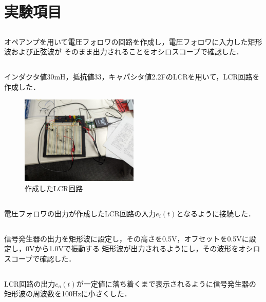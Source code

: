 \documentclass{jlreq}
\begin{document}
    
\tableofcontents
\clearpage

\section{実験項目}
\subsection{}
オペアンプを用いて電圧フォロワの回路を作成し，電圧フォロワに入力した矩形波および正弦波が
そのまま出力されることをオシロスコープで確認した．

\subsection{}
インダクタ値30mH，抵抗値33\Omega，キャパシタ値2.2{\mu}FのLCRを用いて，LCR回路を作成した．
\begin{figure}
    \centering
    \includegraphics[width=0.5\textwidth]{lcr_circuit.jpg}
    \caption{作成したLCR回路}
    \label{fig:lcr_circuit}
\end{figure}

\subsection{}
電圧フォロワの出力が作成したLCR回路の入力$e_i(t)$となるように接続した．

\subsection{}
信号発生器の出力を矩形波に設定し，その高さを0.5V，オフセットを0.5Vに設定し，0Vから1.0Vで振動する
矩形波が出力されるようにし，その波形をオシロスコープで確認した．

\subsection{}
LCR回路の出力$e_o(t)$が一定値に落ち着くまで表示されるように信号発生器の矩形波の周波数を100Hzに小さくした．
\end{document}
